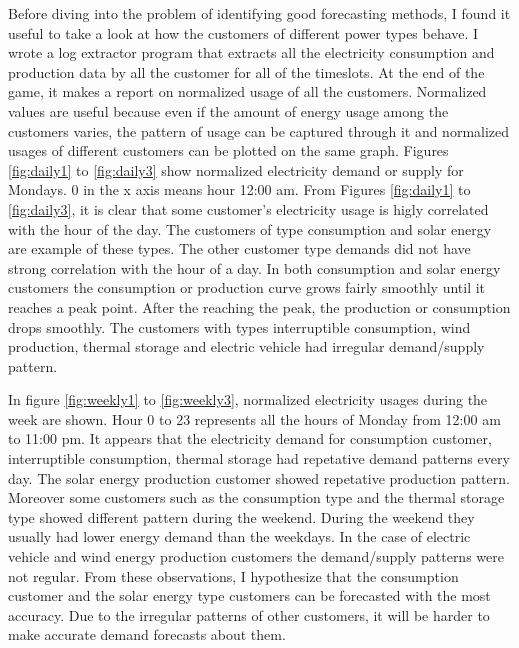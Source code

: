 Before diving into the problem of identifying good forecasting methods, I found it useful to take a look at how the customers of different power types behave. I wrote a log extractor program that extracts all the electricity consumption and production data by all the customer for all of the timeslots. At the end of the game, it makes a report on normalized usage of all the customers. Normalized values are useful because even if the amount of energy usage among the customers varies, the pattern of usage can be captured through it and normalized usages of different customers can be plotted on the same graph. Figures \ref{fig:daily1} to \ref{fig:daily3} show normalized electricity demand or supply for Mondays. 0 in the x axis means hour 12:00 am. From Figures \ref{fig:daily1} to \ref{fig:daily3}, it is clear that some customer's electricity usage is higly correlated with the hour of the day. The customers of type consumption and solar energy are example of these types. The other customer type demands did not have strong correlation with the hour of a day. In both consumption and solar energy customers the consumption or production curve grows fairly smoothly until it reaches a peak point. After the reaching the peak, the production or consumption drops smoothly. The customers with types interruptible consumption, wind production, thermal storage and electric vehicle had irregular demand/supply pattern. 

In figure \ref{fig:weekly1} to \ref{fig:weekly3}, normalized electricity usages during the week are shown. Hour 0 to 23 represents all the hours of Monday from 12:00 am to 11:00 pm. It appears that the electricity demand for consumption customer, interruptible consumption, thermal storage had repetative demand patterns every day. The  solar energy production customer showed repetative production pattern. Moreover some customers such as the consumption type and the thermal storage type showed different pattern during the weekend. During the weekend they usually had lower energy demand than the weekdays. In the case of electric vehicle and wind energy production customers the demand/supply patterns were not regular. From these observations, I hypothesize that the consumption customer and the solar energy type customers can be forecasted with the most accuracy. Due to the irregular patterns of other customers, it will be harder to make accurate demand forecasts about them.
 
